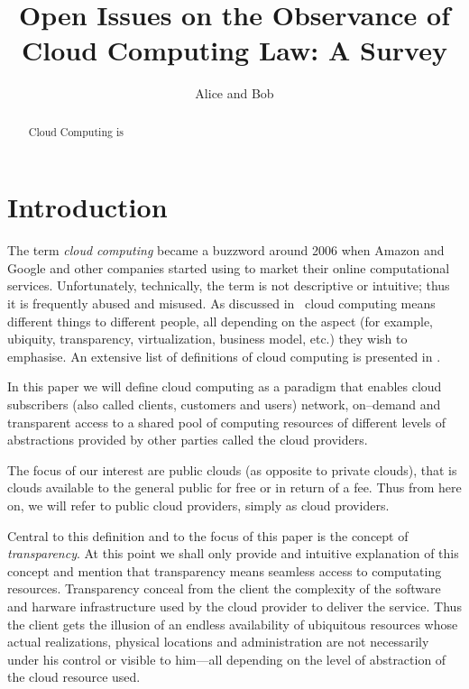 \documentclass[runningheads,a4paper]{llncs}
\title{Open Issues on the Observance of Cloud Computing Law: A Survey}
\author{ Alice and Bob}
\institute{Computer laboratory, University of Cambridge,
        \email{carlos.molina@cl.cam.ac.uk}
}
\begin{document}
\maketitle

\begin{abstract}
Cloud Computing is 

\end{abstract}


\section{Introduction}
\label{Introduction}
The term \emph{cloud computing} became a buzzword around 2006 when Amazon and
Google and other companies started using to market their online computational
services. Unfortunately, technically, the term is not descriptive or intuitive;
thus it is frequently abused and misused. As discussed in~\cite{Vaquero2009}
cloud computing means different things to different people, all depending on
the aspect (for example, ubiquity, transparency, virtualization, 
business model, etc.) they wish to emphasise. An extensive list of definitions
of cloud computing is presented in \cite{LeeBadger2011}. 

In this paper we will 
define cloud computing as a paradigm that enables cloud subscribers
(also called clients, customers and users) network, on--demand and transparent 
access to a shared pool 
of computing resources of different levels of abstractions provided by other 
parties called the cloud providers.

The focus of our interest are public clouds (as opposite to private
clouds), that is clouds available to the general public for free
or in return of a fee. Thus from here on, we will refer to
public cloud providers, simply as cloud providers.

Central to this definition and to the focus of this paper is the
concept of \emph{transparency}. At this point we shall only provide and 
intuitive explanation of this concept and mention that  transparency
means seamless access to computating resources. Transparency conceal
from the client the complexity of the software and harware infrastructure
used by the cloud provider to deliver the service. Thus the client 
gets the illusion of an endless availability of ubiquitous resources 
whose actual realizations, physical locations and administration 
are not necessarily under his control or visible to him---all depending on 
the level of abstraction of the cloud resource used.
\end{document}
